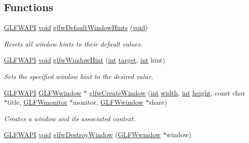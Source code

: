 \subsection*{Functions}
\begin{DoxyCompactItemize}
\item 
\hyperlink{glfw3_8h_a56da5036b2cc259351ae22fd6439bb47}{G\+L\+F\+W\+A\+P\+I} \hyperlink{wglew_8h_aeea6e3dfae3acf232096f57d2d57f084}{void} \hyperlink{group__window_ga8050ddceed9dc6bd9d3aa35666195cd4}{glfw\+Default\+Window\+Hints} (\hyperlink{wglew_8h_aeea6e3dfae3acf232096f57d2d57f084}{void})
\begin{DoxyCompactList}\small\item\em Resets all window hints to their default values. \end{DoxyCompactList}\item 
\hyperlink{glfw3_8h_a56da5036b2cc259351ae22fd6439bb47}{G\+L\+F\+W\+A\+P\+I} \hyperlink{wglew_8h_aeea6e3dfae3acf232096f57d2d57f084}{void} \hyperlink{group__window_gab6e60483d79175b868d6d4dc1dcc63e2}{glfw\+Window\+Hint} (\hyperlink{wglew_8h_a500a82aecba06f4550f6849b8099ca21}{int} \hyperlink{glew_8h_aa43eab0fe80422366a4602998d53b133}{target}, \hyperlink{wglew_8h_a500a82aecba06f4550f6849b8099ca21}{int} hint)
\begin{DoxyCompactList}\small\item\em Sets the specified window hint to the desired value. \end{DoxyCompactList}\item 
\hyperlink{glfw3_8h_a56da5036b2cc259351ae22fd6439bb47}{G\+L\+F\+W\+A\+P\+I} \hyperlink{group__window_ga3c96d80d363e67d13a41b5d1821f3242}{G\+L\+F\+Wwindow} $\ast$ \hyperlink{group__window_ga680a02abe0e4494b6759d5703240713e}{glfw\+Create\+Window} (\hyperlink{wglew_8h_a500a82aecba06f4550f6849b8099ca21}{int} \hyperlink{glew_8h_aa105b18f96e6bc2485cb7f576a7fb9ba}{width}, \hyperlink{wglew_8h_a500a82aecba06f4550f6849b8099ca21}{int} \hyperlink{glew_8h_aa214bd63e12f7ddf524c83894fcc69a7}{height}, const char $\ast$title, \hyperlink{group__monitor_ga8d9efd1cde9426692c73fe40437d0ae3}{G\+L\+F\+Wmonitor} $\ast$monitor, \hyperlink{group__window_ga3c96d80d363e67d13a41b5d1821f3242}{G\+L\+F\+Wwindow} $\ast$share)
\begin{DoxyCompactList}\small\item\em Creates a window and its associated context. \end{DoxyCompactList}\item 
\hyperlink{glfw3_8h_a56da5036b2cc259351ae22fd6439bb47}{G\+L\+F\+W\+A\+P\+I} \hyperlink{wglew_8h_aeea6e3dfae3acf232096f57d2d57f084}{void} \hyperlink{group__window_ga806747476b7247d292be3711c323ea10}{glfw\+Destroy\+Window} (\hyperlink{group__window_ga3c96d80d363e67d13a41b5d1821f3242}{G\+L\+F\+Wwindow} $\ast$window)

\end{DoxyCompactItemize}
